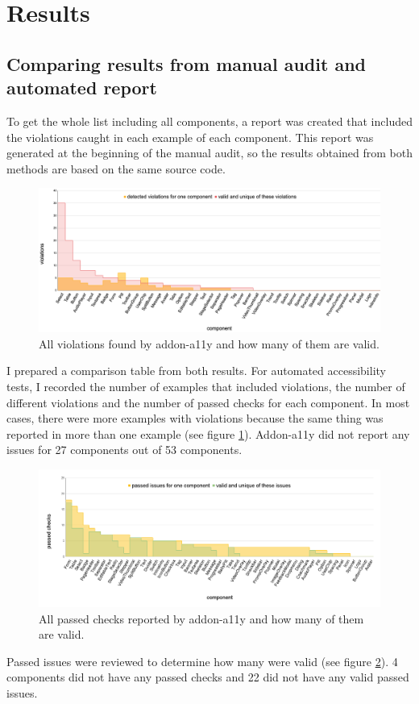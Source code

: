 \documentclass{master_thesis}
\begin{document}
\section{Results}


\subsection{Comparing results from manual audit and automated report}

To get the whole list including all components, a report was created that included the violations caught in each example of each component. This report was generated at the beginning of the manual audit, so the results obtained from both methods are based on the same source code.
\begin{figure}[H]
	\includegraphics[width=\textwidth]{img/audit-failed.png}
	\caption{All violations found by addon-a11y and how many of them are valid.}
	\label{fig:audit-failed}
\end{figure}

I prepared a comparison table from both results. For automated accessibility tests, I recorded the number of examples that included violations, the number of different violations and the number of passed checks for each component. In most cases, there were more examples with violations because the same thing was reported in more than one example (see figure \ref{fig:audit-failed}). Addon-a11y did not report any issues for 27 components out of 53 components.

\begin{figure}[H]
	\includegraphics[width=\textwidth]{img/audit-passed.png}
	\caption{All passed checks reported by addon-a11y and how many of them are valid. }
	\label{fig:audit-passed}
\end{figure}
Passed issues were reviewed to determine how many were valid (see figure \ref{fig:audit-passed}). 4 components did not have any passed checks and 22 did not have any valid passed issues.
\end{document}

